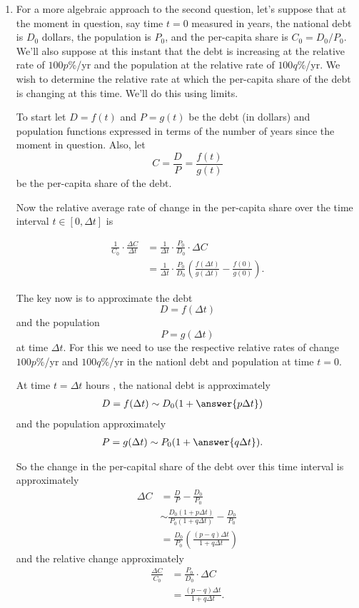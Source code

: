 \documentclass{ximera}
\begin{document}
\begin{question}
\begin{enumerate}
\item For a more algebraic approach to the second question, let's suppose that at the moment in question, say time $t=0$ measured in years, the national debt is $D_0$ dollars, the population is $P_0$, and the per-capita share is $C_0 = D_0/P_0$. We'll also suppose at this instant that the debt is increasing at the relative rate of $100p\%$/yr and the population at the relative rate of $100q\%$/yr. We wish to determine the relative rate at which the per-capita share of the debt is changing at this time. We'll do this using limits.

To start let $D=f(t)$ and $P=g(t)$ be the debt (in dollars) and population functions expressed in terms of the number of years since the moment in question. Also, let 
\[
      C = \frac{D}{P} = \frac{f(t)}{g(t)}
\]
be the per-capita share of the debt.


Now the relative average rate of change in the per-capita share over the time interval $t\in [0, \Delta t]$ is

\begin{align*}
 \frac{1}{C_0} \cdot \frac{\Delta C}{\Delta t} &=  \frac{1}{\Delta t} \cdot \frac{P_0}{D_0} \cdot \Delta C \\ 
                                                                &= \frac{1}{\Delta t} \cdot \frac{P_0}{D_0} \left( \frac{f(\Delta t)}{g(\Delta t)} - \frac{f(0)}{g(0)} \right) .
\end{align*}

The key now is to approximate the debt %
\[ 
D =  f(\Delta t)
\]
and the population
\[
  P = g(\Delta t) 
\] 
at time $\Delta t$. For this we need to use the respective relative rates of change $100p\%$/yr and $100q\%$/yr in the nationl debt and population at time $t=0$.

At time $t = \Delta t$ hours , the national debt is approximately
\begin{align*}
   D =f(\Delta t)  &\sim  D_0(1+ \answer{p \Delta t })
\end{align*}
and the population approximately
\begin{align*}
   P =g(\Delta t) &\sim P_0(1+ \answer{q \Delta t }) . 
\end{align*}

So the  change in the per-capital share of the debt over this time interval is approximately
\begin{align*}
  \Delta C   &= \frac{D}{P} - \frac{D_0}{P_0} \\
                 &\sim \frac{D_0(1+p\Delta t)}{P_0 (1+q\Delta t)} - \frac{D_0}{P_0} \\
                 &= \frac{D_0}{P_0} \left(   \frac{(p-q)\Delta t}{1+q\Delta t}    \right) 
\end{align*}
and the relative change approximately
\begin{align*}
   \frac{\Delta C}{C_0}  &= \frac{P_0}{D_0} \cdot \Delta C  \\
                                   &=  \frac{(p-q)\Delta t}{1+q\Delta t} .
\end{align*}



\end{enumerate}
\end{question}
\end{document}
